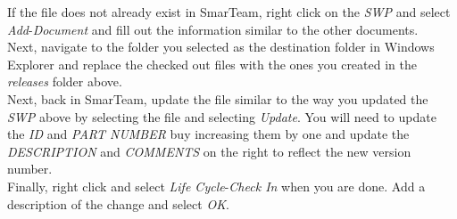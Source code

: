 \documentclass[10pt]{article}
\begin{document}
                If the file does not already exist in SmarTeam, right click on the \emph{SWP} and select \emph{Add}-\emph{Document} and fill out the information similar to the other documents. \\
                Next, navigate to the folder you selected as the destination folder in Windows Explorer and replace the checked out files with the ones you created in the \emph{releases} folder above. \\
                Next, back in SmarTeam, update the file similar to the way you updated the \emph{SWP} above by selecting the file and selecting \emph{Update}. You will need to update the \emph{ID} and \emph{PART NUMBER} buy increasing them by one and update the \emph{DESCRIPTION} and \emph{COMMENTS} on the right to reflect the new version number. \\
                Finally, right click and select \emph{Life Cycle}-\emph{Check In} when you are done. Add a description of the change and select \emph{OK}.
\end{document}
